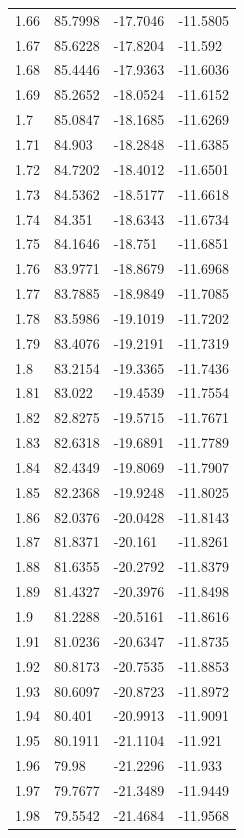 \begin{tabular}{llll}
1.66 & 85.7998 & -17.7046 & -11.5805 \\
1.67 & 85.6228 & -17.8204 & -11.592 \\
1.68 & 85.4446 & -17.9363 & -11.6036 \\
1.69 & 85.2652 & -18.0524 & -11.6152 \\
1.7 & 85.0847 & -18.1685 & -11.6269 \\
1.71 & 84.903 & -18.2848 & -11.6385 \\
1.72 & 84.7202 & -18.4012 & -11.6501 \\
1.73 & 84.5362 & -18.5177 & -11.6618 \\
1.74 & 84.351 & -18.6343 & -11.6734 \\
1.75 & 84.1646 & -18.751 & -11.6851 \\
1.76 & 83.9771 & -18.8679 & -11.6968 \\
1.77 & 83.7885 & -18.9849 & -11.7085 \\
1.78 & 83.5986 & -19.1019 & -11.7202 \\
1.79 & 83.4076 & -19.2191 & -11.7319 \\
1.8 & 83.2154 & -19.3365 & -11.7436 \\
1.81 & 83.022 & -19.4539 & -11.7554 \\
1.82 & 82.8275 & -19.5715 & -11.7671 \\
1.83 & 82.6318 & -19.6891 & -11.7789 \\
1.84 & 82.4349 & -19.8069 & -11.7907 \\
1.85 & 82.2368 & -19.9248 & -11.8025 \\
1.86 & 82.0376 & -20.0428 & -11.8143 \\
1.87 & 81.8371 & -20.161 & -11.8261 \\
1.88 & 81.6355 & -20.2792 & -11.8379 \\
1.89 & 81.4327 & -20.3976 & -11.8498 \\
1.9 & 81.2288 & -20.5161 & -11.8616 \\
1.91 & 81.0236 & -20.6347 & -11.8735 \\
1.92 & 80.8173 & -20.7535 & -11.8853 \\
1.93 & 80.6097 & -20.8723 & -11.8972 \\
1.94 & 80.401 & -20.9913 & -11.9091 \\
1.95 & 80.1911 & -21.1104 & -11.921 \\
1.96 & 79.98 & -21.2296 & -11.933 \\
1.97 & 79.7677 & -21.3489 & -11.9449 \\
1.98 & 79.5542 & -21.4684 & -11.9568 \\

\end{tabular}
